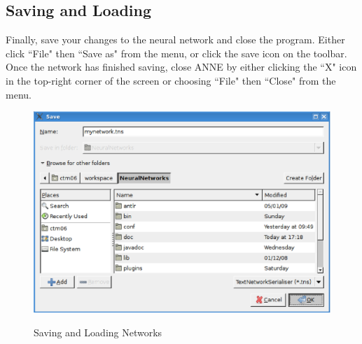 \documentclass[11pt]{report}
\begin{document}
\subsection{Saving and Loading}
{
Finally, save your changes to the neural network and close the program. Either click ``File" then ``Save as" from the menu, or click the save icon on the toolbar. Once the network has finished saving, close ANNE by either clicking the ``X" icon in the top-right corner of the screen or choosing ``File" then ``Close" from the menu.

\begin{figure}[t]
\centering
\scalebox{0.4} {
	\includegraphics{save}
}
\caption{Saving and Loading Networks}
\label{fig:save}
\end{figure}
}
\end{document}
